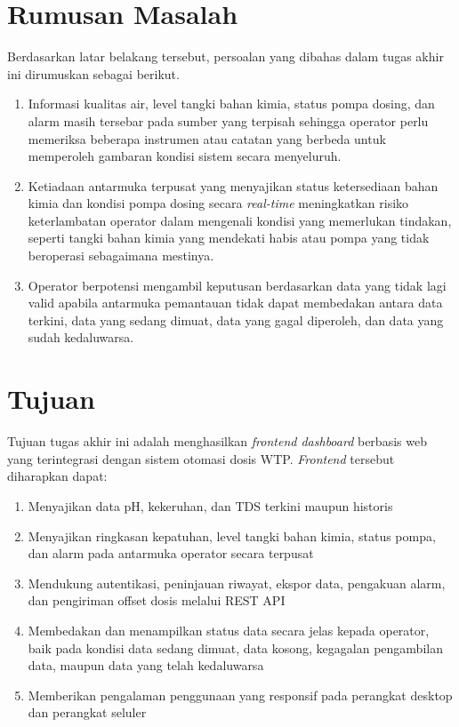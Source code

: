 \section{Rumusan Masalah}
Berdasarkan latar belakang tersebut, persoalan yang dibahas dalam tugas akhir
ini dirumuskan sebagai berikut.
\begin{enumerate}
    \item Informasi kualitas air, level tangki bahan kimia, status pompa
    dosing, dan alarm masih tersebar pada sumber yang terpisah sehingga
    operator perlu memeriksa beberapa instrumen atau catatan yang berbeda
    untuk memperoleh gambaran kondisi sistem secara menyeluruh.
    \item Ketiadaan antarmuka terpusat yang menyajikan status ketersediaan
    bahan kimia dan kondisi pompa dosing secara \textit{real-time}
    meningkatkan risiko keterlambatan operator dalam mengenali kondisi yang
    memerlukan tindakan, seperti tangki bahan kimia yang mendekati habis atau
    pompa yang tidak beroperasi sebagaimana mestinya.
    \item Operator berpotensi mengambil keputusan berdasarkan data yang tidak
    lagi valid apabila antarmuka pemantauan tidak dapat membedakan antara
    data terkini, data yang sedang dimuat, data yang gagal diperoleh, dan
    data yang sudah kedaluwarsa.
\end{enumerate}

\section{Tujuan}
Tujuan tugas akhir ini adalah menghasilkan \textit{frontend dashboard} berbasis web yang
terintegrasi dengan sistem otomasi dosis WTP. \textit{Frontend} tersebut diharapkan dapat:
\begin{enumerate}
    \item Menyajikan data pH, kekeruhan, dan TDS terkini maupun historis
    \item Menyajikan ringkasan kepatuhan, level tangki bahan kimia, status pompa,
    dan alarm pada antarmuka operator secara terpusat
    \item Mendukung autentikasi, peninjauan riwayat, ekspor data, pengakuan alarm,
    dan pengiriman offset dosis melalui REST API
    \item Membedakan dan menampilkan status data secara jelas kepada operator,
    baik pada kondisi data sedang dimuat, data kosong, kegagalan pengambilan
    data, maupun data yang telah kedaluwarsa
    \item Memberikan pengalaman penggunaan yang responsif pada perangkat desktop
    dan perangkat seluler
\end{enumerate}

